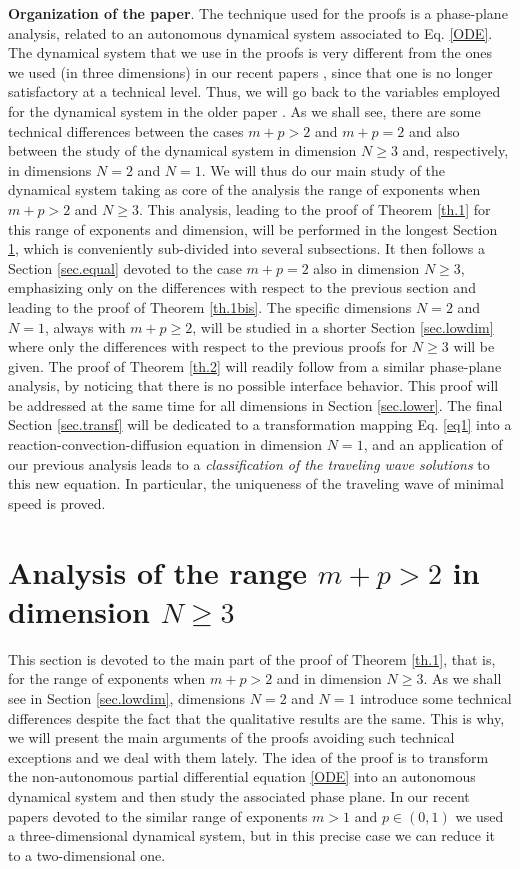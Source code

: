 \documentclass[a4paper,11pt]{article}
\numberwithin{equation}{section}
\begin{document}
\medskip

\noindent \textbf{Organization of the paper}. The technique used for the proofs is a phase-plane analysis, related to an autonomous dynamical system associated to Eq. \eqref{ODE}. The dynamical system that we use in the proofs is very different from the ones we used (in three dimensions) in our recent papers \cite{IS20b, IS21b}, since that one is no longer satisfactory at a technical level. Thus, we will go back to the variables employed for the dynamical system in the older paper \cite{ISV08}. As we shall see, there are some technical differences between the cases $m+p>2$ and $m+p=2$ and also between the study of the dynamical system in dimension $N\geq3$ and, respectively, in dimensions $N=2$ and $N=1$. We will thus do our main study of the dynamical system taking as core of the analysis the range of exponents when $m+p>2$ and $N\geq3$. This analysis, leading to the proof of Theorem \ref{th.1} for this range of exponents and dimension, will be performed in the longest Section \ref{sec.large}, which is conveniently sub-divided into several subsections. It then follows a Section \ref{sec.equal} devoted to the case $m+p=2$ also in dimension $N\geq3$, emphasizing only on the differences with respect to the previous section and leading to the proof of Theorem \ref{th.1bis}. The specific dimensions $N=2$ and $N=1$, always with $m+p\geq2$, will be studied in a shorter Section \ref{sec.lowdim} where only the differences with respect to the previous proofs for $N\geq3$ will be given. The proof of Theorem \ref{th.2} will readily follow from a similar phase-plane analysis, by noticing that there is no possible interface behavior. This proof will be addressed at the same time for all dimensions in Section \ref{sec.lower}. The final Section \ref{sec.transf} will be dedicated to a transformation mapping Eq. \eqref{eq1} into a reaction-convection-diffusion equation in dimension $N=1$, and an application of our previous analysis leads to a \emph{classification of the traveling wave solutions} to this new equation. In particular, the uniqueness of the traveling wave of minimal speed is proved.

\section{Analysis of the range $m+p>2$ in dimension $N\geq3$}\label{sec.large}

This section is devoted to the main part of the proof of Theorem \ref{th.1}, that is, for the range of exponents when $m+p>2$ and in dimension $N\geq3$. As we shall see in Section \ref{sec.lowdim}, dimensions $N=2$ and $N=1$ introduce some technical differences despite the fact that the qualitative results are the same. This is why, we will present the main arguments of the proofs avoiding such technical exceptions and we deal with them lately. The idea of the proof is to transform the non-autonomous partial differential equation \eqref{ODE} into an autonomous dynamical system and then study the associated phase plane. In our recent papers devoted to the similar range of exponents $m>1$ and $p\in(0,1)$ we used a three-dimensional dynamical system, but in this precise case we can reduce it to a two-dimensional one.
\end{document}
